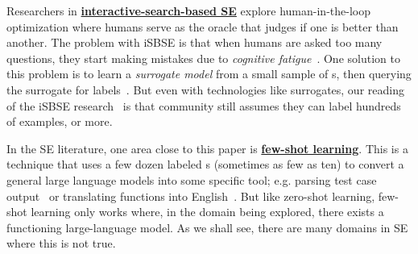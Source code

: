 Researchers in  \underline{\bf  interactive-search-based SE} explore human-in-the-loop optimization where humans serve as the oracle that judges  if one {\eg} is better than another.
The problem
with iSBSE is that when humans are asked too many questions,
they start making mistakes due to  {\em cognitive fatigue}~\cite{shackelford2007implementation}.
One solution to this problem is to learn a {\em surrogate model} from a small sample of {\eg}s, then querying the surrogate for labels~\cite{araujo2017architecture}.  But even with technologies like surrogates, our reading of the iSBSE
research~\cite{lin2016interactive,amal2014use,araujo2017architecture} is that community still assumes they can  label hundreds of examples, or more.

In the SE literature, one area close to this paper
is
\underline{\bf few-shot learning}.
This is a technique that uses 
a few dozen  labeled {\eg}s (sometimes as few as ten)   
to convert a general large  language models into some specific tool; e.g. 
 parsing   test  case output~\cite{le2023log} or translating functions into English~\cite{10.1145/3551349.3559555}. But
 like zero-shot learning, few-shot learning
 only works where, in the domain being explored, there exists
 a functioning large-language model. As we shall see, there are many domains in SE where this is not true.

